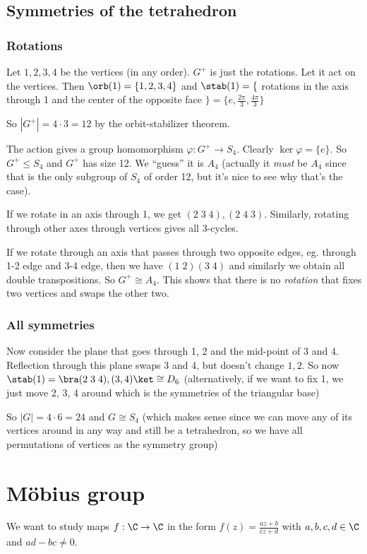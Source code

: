 \documentclass[a4paper]{article}
\begin{document}
\subsection{Symmetries of the tetrahedron}
\subsubsection{Rotations}
Let $1, 2, 3, 4$ be the vertices (in any order). $G^+$ is just the rotations. Let it act on the vertices. Then $\orb(1) = \{1, 2, 3, 4\}$ and $\stab(1) = \{$ rotations in the axis through 1 and the center of the opposite face $\} = \{e, \frac{2\pi}{3}, \frac{4\pi}{3}\}$

So $|G^+| = 4\cdot 3 = 12$ by the orbit-stabilizer theorem.

The action gives a group homomorphism $\varphi: G^+ \to S_4$. Clearly $\ker \varphi = \{e\}$. So $G^+ \leq S_4$ and $G^+$ has size 12. We ``guess'' it is $A_4$ (actually it \emph{must} be $A_4$ since that is the only subgroup of $S_4$ of order 12, but it's nice to see why that's the case).

If we rotate in an axis through 1, we get $(2\; 3\; 4), (2\; 4\; 3)$. Similarly, rotating through other axes through vertices gives all 3-cycles.

If we rotate through an axis that passes through two opposite edges, eg. through 1-2 edge and 3-4 edge, then we have $(1\; 2)(3\; 4)$ and similarly we obtain all double transpositions. So $G^+ \cong A_4$. This shows that there is no \emph{rotation} that fixes two vertices and swaps the other two.

\subsubsection{All symmetries}
Now consider the plane that goes through 1, 2 and the mid-point of 3 and 4. Reflection through this plane swaps 3 and 4, but doesn't change $1, 2$. So now $\stab(1) = \bra (2\; 3\; 4), (3, 4)\ket \cong D_6$ (alternatively, if we want to fix 1, we just move 2, 3, 4 around which is the symmetries of the triangular base)

So $|G| = 4\cdot 6 = 24$ and $G\cong S_4$ (which makes sense since we can move any of its vertices around in any way and still be a tetrahedron, so we have all permutations of vertices as the symmetry group)

\section{M\"obius group}
We want to study maps $f: \C \to \C$ in the form $f(z) = \frac{az + b}{cz + d}$ with $a, b, c, d\in \C$ and $ad - bc \not= 0$.
\end{document}
